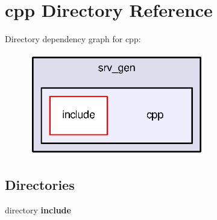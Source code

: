 \section{cpp Directory Reference}
\label{dir_fc0bdfbc365cdc6d7f2fe6711f5f70b2}
Directory dependency graph for cpp\-:\nopagebreak
\begin{figure}[H]
\begin{center}
\leavevmode
\includegraphics[width=218pt]{dir_fc0bdfbc365cdc6d7f2fe6711f5f70b2_dep}
\end{center}
\end{figure}
\subsection*{Directories}
\begin{DoxyCompactItemize}
\item 
directory {\bf include}
\end{DoxyCompactItemize}
